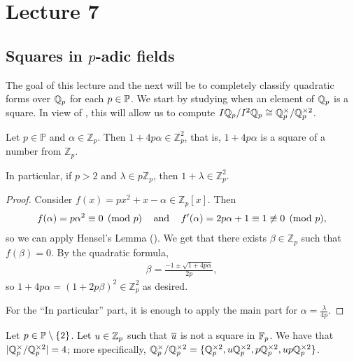 \documentclass[12pt, leqno, british]{amsart}
\author{Nicolas Daans}
\begin{document}
\section{Lecture 7}

\subsection{Squares in $p$-adic fields}
The goal of this lecture and the next will be to completely classify quadratic forms over $\mathbb Q_p$ for each $p \in \mathbb{P}$.
We start by studying when an element of $\mathbb Q_p$ is a square.
In view of , this will allow us to compute $I\mathbb Q_p/I^2\mathbb Q_p \cong \mathbb Q_p^{\times}/\mathbb Q_p^{\times 2}$.

\begin{prop}\label{LocalSquareThm}
Let $p\in\mathbb{P}$ and $\alpha\in\mathbb{Z}_{p}$. Then $1+4p\alpha\in\mathbb{Z}_{p}^{2}$, that is, $1+4p\alpha$ is a square of a number from $\mathbb{Z}_{p}$.

In particular, if $p>2$ and $\lambda\in p\mathbb{Z}_{p}$, then $1+\lambda\in\mathbb{Z}_{p}^{2}$.
\end{prop}
\begin{proof}
Consider $f(x)=px^{2} + x - \alpha\in\mathbb{Z}_{p}[x]$. Then
\begin{align*}
f(\alpha ) = p\alpha^{2} \equiv 0 \pmod{p} \hspace{0.3cm} \textrm{ and } \hspace{0.3cm} f'(\alpha ) =2p\alpha + 1\equiv 1\not\equiv 0 \pmod{p},
\end{align*}
so we can apply Hensel's Lemma (). We get that there exists $\beta\in\mathbb{Z}_{p}$ such that $f(\beta )=0$. By the quadratic formula, 
\begin{align*}
\beta = \frac{-1 \pm \sqrt{1+4p\alpha}}{2p},
\end{align*}
so $1+4p\alpha = (1+2p\beta )^{2} \in\mathbb{Z}_{p}^{2}$ as desired.

For the ``In particular'' part, it is enough to apply the main part for $\alpha =\frac{\lambda}{4p}$.
\end{proof}
\begin{cor}\label{C:qqp-squares-odd}
Let $p \in \mathbb P \setminus \lbrace 2 \rbrace$.
Let $u \in \mathbb Z_p$ such that $\overline u$ is not a square in $\mathbb F_p$.
We have that $\lvert \mathbb Q_p^\times / \mathbb Q_p^{\times 2}\rvert = 4$; more specifically, $\mathbb Q_p^\times / \mathbb Q_p^{\times 2} = \lbrace \mathbb Q_p^{\times 2}, u\mathbb Q_p^{\times 2}, p\mathbb Q_p^{\times 2}, up\mathbb Q_p^{\times 2} \rbrace$.
\end{cor}
\end{document}

